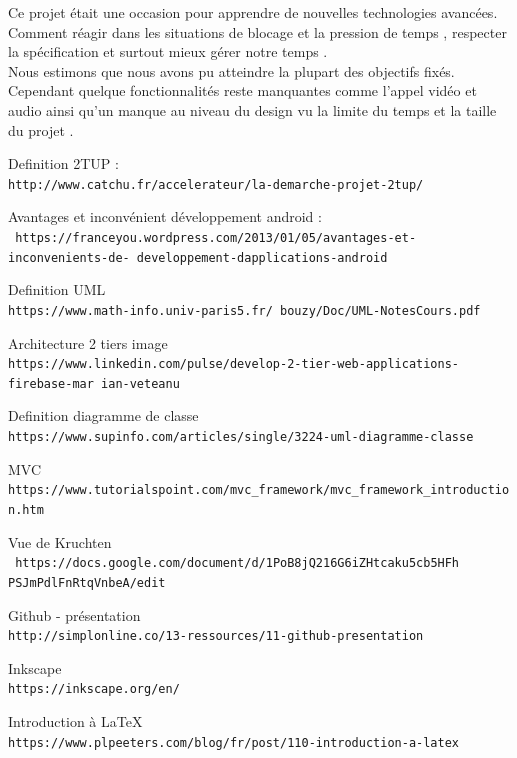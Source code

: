 \documentclass[11pt,a4paper,oneside]{book}
\begin{document}
					Ce projet était une occasion pour apprendre de nouvelles technologies avancées. Comment réagir dans les situations de blocage et la pression de temps , respecter la spécification et surtout mieux gérer notre temps .\\
					
					Nous estimons que nous avons pu atteindre la plupart des objectifs fixés. Cependant quelque fonctionnalités reste manquantes comme l’appel vidéo et audio ainsi qu’un manque au niveau du design vu la limite du temps et la taille du projet .
					\begin{thebibliography}{9}
	Definition 2TUP :\
	\\\texttt{http://www.catchu.fr/accelerateur/la-demarche-projet-2tup/}
	
	Avantages et inconvénient développement android :
	\\\texttt{	https://franceyou.wordpress.com/2013/01/05/avantages-et-inconvenients-de-
		developpement-dapplications-android}
	
	Definition UML
	\\\texttt{https://www.math-info.univ-paris5.fr/ bouzy/Doc/UML-NotesCours.pdf}
	
	Architecture 2 tiers image
	\\\texttt{https://www.linkedin.com/pulse/develop-2-tier-web-applications-firebase-mar
		ian-veteanu}
	
	Definition diagramme de classe
	\\\texttt{https://www.supinfo.com/articles/single/3224-uml-diagramme-classe}
	
	MVC
	\\\texttt{https://www.tutorialspoint.com/mvc_framework/mvc_framework_introduction.htm}
	
	Vue de Kruchten
	\\\texttt{	https://docs.google.com/document/d/1PoB8jQ216G6iZHtcaku5cb5HFh
		PSJmPdlFnRtqVnbeA/edit}
	
	
	Github - présentation
	\\\texttt{http://simplonline.co/13-ressources/11-github-presentation}
	
	Inkscape
	\\\texttt{https://inkscape.org/en/}
	
	Introduction à LaTeX
	\\\texttt{https://www.plpeeters.com/blog/fr/post/110-introduction-a-latex}
	

\end{thebibliography}
\end{document}
